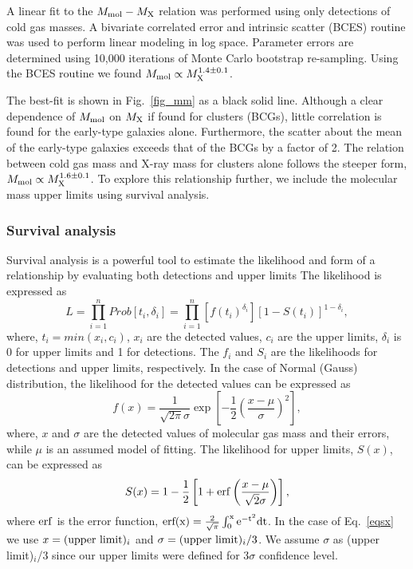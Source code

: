 \documentclass[iop]{emulateapj}
\begin{document}
A linear fit to the $M_{\rm mol}-M_{\rm X}$ relation was performed using only detections of cold gas masses.  A bivariate correlated error and intrinsic scatter (BCES) routine \citep{Akritas:96} was used to perform linear modeling in log space. Parameter errors are determined using 10,000 iterations of Monte Carlo bootstrap re-sampling. Using the BCES routine we found $M_{\rm mol} \propto M_{\rm X}^{1.4\pm0.1}$. 

The best-fit is shown in Fig.~\ref{fig_mm} as a black solid line. Although a clear dependence of $M_{\rm mol}$ on $M_{\rm X}$ if found for clusters (BCGs), little correlation is found for the early-type galaxies alone. Furthermore, the scatter about the mean of the early-type galaxies exceeds that of the BCGs by a factor of 2. The relation between cold gas mass and X-ray mass for clusters alone follows the steeper form, $M_{\rm mol} \propto M_{\rm X}^{1.6\pm0.1}$. To explore this relationship further, we include the molecular mass upper limits using survival analysis.

\subsubsection{Survival analysis}
Survival analysis is a powerful tool to estimate the likelihood and form of a relationship by evaluating both detections and upper limits \citep{statsu, statsu1, statsu2}  
The likelihood is expressed as
\begin{equation}
 L = \prod_{i=1}^n Prob[t_i,\delta_i] = \prod_{i=1}^{n} [f(t_i)^{\delta_i}][1 - S(t_i)]^{1-\delta_i},
\end{equation}
where, $t_i = min(x_i,c_i)$, $x_i$ are the detected values, $c_i$ are the upper limits, $\delta_i$ is 0 for upper limits and 1 for detections. The $f_i$ and $S_i$ are the likelihoods for detections and upper limits, respectively. In the case of Normal (Gauss) distribution, the likelihood for the detected values can be expressed as
\begin{equation}
 f(x) = \frac{1}{\sqrt{2\pi}\sigma} \exp{\left[ -\frac{1}{2} \left( \frac{x-\mu}{\sigma}\right)^2 \right]},
\end{equation}
where, $x$ and $\sigma$ are the detected values of molecular gas mass and their errors, while $\mu$ is an assumed model of fitting. The likelihood for upper limits, $S(x)$, can be expressed as 
\begin{equation}
 S(x) = 1-\frac{1}{2} \left[ 1 + {\rm erf} \left( \frac{x-\mu}{\sqrt{2}\sigma} \right) \right],
 \label{eqsx}
\end{equation}
where $\rm erf$ is the error function, $\rm erf(x) = \frac{2}{\sqrt{\pi}} \int_0^x{e^{-t^2}}dt$. In the case of Eq.~\ref{eqsx} we use $x = ({\rm upper\ limit})_i$ and $\sigma = ({\rm upper\ limit})_i/3$. We assume $\sigma$ as ({\rm upper limit})$_i$/3 since our upper limits were defined for 3$\sigma$ confidence level. 
\end{document}
